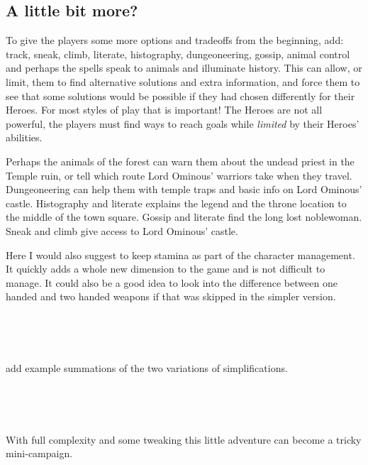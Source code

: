 \subsection*{A little bit more?}
To give the players some more options and tradeoffs from the beginning, 
add: track, sneak, climb, literate, histography, dungeoneering, gossip, animal control and perhaps the spells speak to animals and illuminate history. This can allow, or limit, them to find alternative solutions and extra information, and force them to see that some solutions would be possible if they had chosen differently for their Heroes. For most styles of play that is important! The Heroes are not all powerful, the players must find ways to reach goals while \emph{limited} by their Heroes' abilities. 

Perhaps the animals of the forest can warn them about the undead priest in the Temple ruin, or tell which route Lord Ominous' warriors take when they travel. Dungeoneering can help them with temple traps and basic info on Lord Ominous' castle. Histography and literate explains the legend and the throne location to the middle of the town square. Gossip and literate find the long lost noblewoman. Sneak and climb give access to Lord Ominous' castle.

Here I would also suggest to keep stamina as part of the character management. It quickly adds a whole new dimension to the game and is not difficult to manage. It could also be a good idea to look into the difference between one handed and two handed weapons if that was skipped in the simpler version.

\

\

\todo add example summations of the two variations of simplifications.

\

\

With full complexity and some tweaking this little adventure can become a tricky mini-campaign. 
















\clearpage

